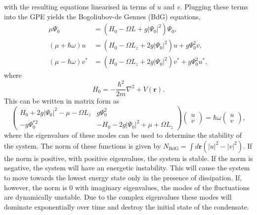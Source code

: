 with the resulting equations linearised in terms of $u$ and $v$. Plugging these terms into the GPE yields the Bogoliubov-de Gennes (BdG) equations,
\begin{subequations}\label{eqn:bogo_lhsrhs}
\begin{align}
    \mu \Psi_0 &= (H_0 - \Omega L + g |\Psi_0|^2)\Psi_0,\\
    (\mu +\hbar\omega)u &= (H_0 - \Omega L_z + 2g|\Psi_0|^2)u + g\Psi_0^2 v,\\
    (\mu -\hbar\omega)v^{*} &= (H_0 - \Omega L_z + 2g|\Psi_0|^2)v^{*} + g\Psi_0^2 u^{*},
\end{align}
\end{subequations}
where
\begin{equation}\label{eqn:bogo_h0}
H_0 = -\frac{\hbar^2}{2m}\nabla^2 + V(\mathbf{r}).
\end{equation}
This can be written in matrix form as
\begin{equation}
    \begin{pmatrix}
        H_0 + 2g|\Psi_0|^2- \mu -\Omega L_z & g\Psi_0^2 \\
        -g\Psi_0^{*2} & -H_0 - 2g|\Psi_0|^2 + \mu +\Omega L_z
    \end{pmatrix}
    \begin{pmatrix}
        u \\
        v
    \end{pmatrix}
    = \hbar\omega
    \begin{pmatrix}
        u \\
        v
    \end{pmatrix},
\end{equation}
where the eigenvalues of these modes can be used to determine the stability of the system. The norm of these functions is given by $N_{\textrm{BdG}}=\int d\mathbf{r}(|u|^2 - |v|^2)$. If the norm is positive, with positive eigenvalues, the system is stable. If the norm is negative, the system will have an energetic instability. This will cause the system to move towards the lowest energy state only in the presence of dissipation. If, however, the norm is 0 with imaginary eigenvalues, the modes of the fluctuations are dynamically unstable. Due to the complex eigenvalues these modes will dominate exponentially over time and destroy the initial state of the condensate. %

